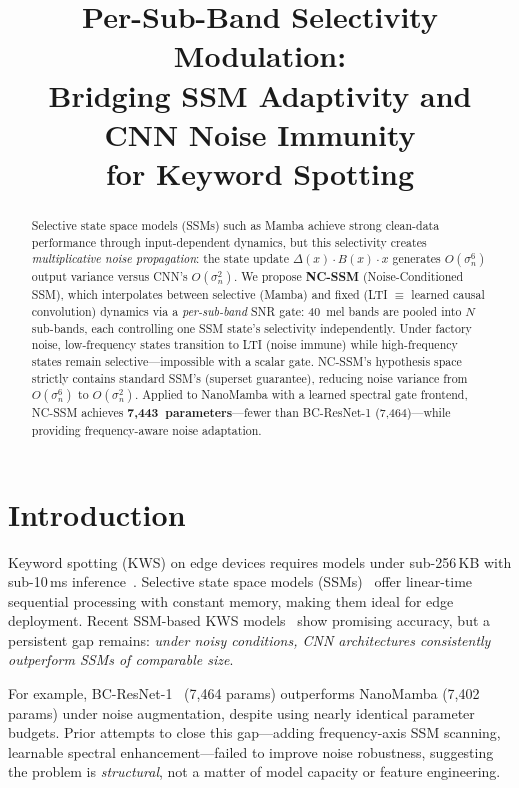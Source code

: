\documentclass{Interspeech}
\title{Per-Sub-Band Selectivity Modulation:\\Bridging SSM Adaptivity and CNN Noise Immunity\\for Keyword Spotting}
\begin{document}
\maketitle

\begin{abstract}
Selective state space models (SSMs) such as Mamba achieve strong clean-data performance through input-dependent dynamics, but this selectivity creates \emph{multiplicative noise propagation}: the state update $\Delta(x) \cdot B(x) \cdot x$ generates $O(\sigma_n^6)$ output variance versus CNN's $O(\sigma_n^2)$.
We propose \textbf{NC-SSM} (Noise-Conditioned SSM), which interpolates between selective (Mamba) and fixed (LTI $\equiv$ learned causal convolution) dynamics via a \emph{per-sub-band} SNR gate: 40~mel bands are pooled into $N$ sub-bands, each controlling one SSM state's selectivity independently.
Under factory noise, low-frequency states transition to LTI (noise immune) while high-frequency states remain selective---impossible with a scalar gate.
NC-SSM's hypothesis space strictly contains standard SSM's (superset guarantee), reducing noise variance from $O(\sigma_n^6)$ to $O(\sigma_n^2)$.
Applied to NanoMamba with a learned spectral gate frontend, NC-SSM achieves \textbf{7,443~parameters}---fewer than BC-ResNet-1 (7,464)---while providing frequency-aware noise adaptation.
\end{abstract}

\section{Introduction}

Keyword spotting (KWS) on edge devices requires models under sub-256\,KB with sub-10\,ms inference~\cite{banbury2021mlperf,lin2020mcunet}.
Selective state space models (SSMs)~\cite{gu2024mamba,gu2022efficiently} offer linear-time sequential processing with constant memory, making them ideal for edge deployment.
Recent SSM-based KWS models~\cite{goel2024keyword} show promising accuracy, but a persistent gap remains: \emph{under noisy conditions, CNN architectures consistently outperform SSMs of comparable size}.

For example, BC-ResNet-1~\cite{kim2021bcresnet} (7,464 params) outperforms NanoMamba (7,402 params) under noise augmentation, despite using nearly identical parameter budgets.
Prior attempts to close this gap---adding frequency-axis SSM scanning, learnable spectral enhancement---failed to improve noise robustness, suggesting the problem is \emph{structural}, not a matter of model capacity or feature engineering.
\end{document}
